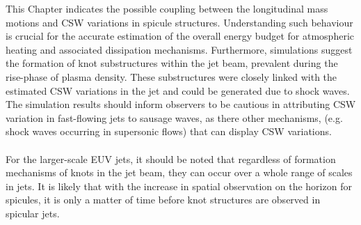 \documentclass[12pt]{ociamthesis}
\newcommand{\np}{\\ \\}
\begin{document}
%
This Chapter indicates the possible coupling between the longitudinal mass motions and CSW variations in spicule structures. Understanding such behaviour is crucial for the accurate estimation of the overall energy budget for atmospheric heating and associated dissipation mechanisms. Furthermore, simulations suggest the formation of knot substructures within the jet beam, prevalent during the rise-phase of plasma density. These substructures were closely linked with the estimated CSW variations in the jet and could be generated due to shock waves. The simulation results should inform observers to be cautious in attributing CSW variation in fast-flowing jets to sausage waves, as there other mechanisms, (e.g. shock waves occurring in supersonic flows) that can display CSW variations. \np
%
For the larger-scale EUV jets, it should be noted that regardless of formation mechanisms of knots in the jet beam, they can occur over a whole range of scales in jets. It is likely that with the increase in spatial observation on the horizon for spicules, it is only a matter of time before knot structures are observed in spicular jets.


  
\end{document}
